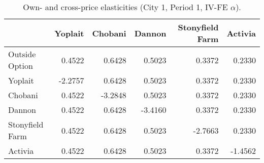 \begin{table}[H]
\centering
\caption{Own- and cross-price elasticities (City 1, Period 1, IV-FE $\hat\alpha$).}
\label{tab:q13_elast_c1t1}
\begin{tabular}{lrrrrr}
\toprule
 & Yoplait & Chobani & Dannon & Stonyfield Farm & Activia \\
\midrule
Outside Option & 0.4522 & 0.6428 & 0.5023 & 0.3372 & 0.2330 \\
Yoplait & -2.2757 & 0.6428 & 0.5023 & 0.3372 & 0.2330 \\
Chobani & 0.4522 & -3.2848 & 0.5023 & 0.3372 & 0.2330 \\
Dannon & 0.4522 & 0.6428 & -3.4160 & 0.3372 & 0.2330 \\
Stonyfield Farm & 0.4522 & 0.6428 & 0.5023 & -2.7663 & 0.2330 \\
Activia & 0.4522 & 0.6428 & 0.5023 & 0.3372 & -1.4562 \\
\bottomrule
\end{tabular}
\end{table}
